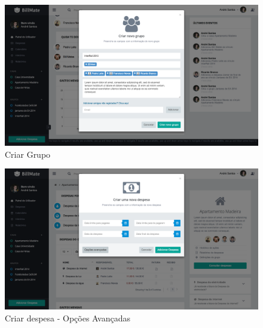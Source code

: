 \begin{figure}[H]
{
\includegraphics[width=.5\textwidth]{images/andre/create_collective}
\caption{Criar Grupo}
}
\end{figure}

\begin{figure}[H]
{
\includegraphics[width=.5\textwidth]{images/andre/cexpadv}
\caption{Criar despesa - Opções Avançadas}
}
\end{figure}


